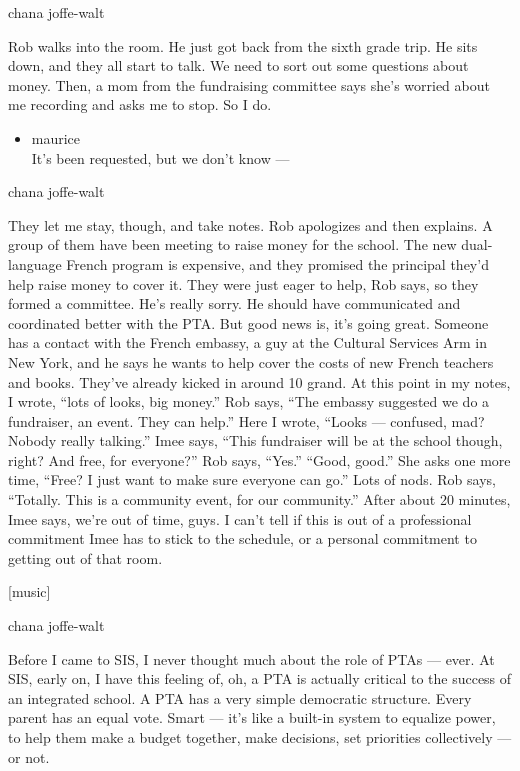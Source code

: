 chana joffe-walt

Rob walks into the room. He just got back from the sixth grade trip. He
sits down, and they all start to talk. We need to sort out some
questions about money. Then, a mom from the fundraising committee says
she's worried about me recording and asks me to stop. So I do.

\begin{itemize}
\tightlist
\item
  maurice\\
  It's been requested, but we don't know ---
\end{itemize}

chana joffe-walt

They let me stay, though, and take notes. Rob apologizes and then
explains. A group of them have been meeting to raise money for the
school. The new dual-language French program is expensive, and they
promised the principal they'd help raise money to cover it. They were
just eager to help, Rob says, so they formed a committee. He's really
sorry. He should have communicated and coordinated better with the PTA.
But good news is, it's going great. Someone has a contact with the
French embassy, a guy at the Cultural Services Arm in New York, and he
says he wants to help cover the costs of new French teachers and books.
They've already kicked in around 10 grand. At this point in my notes, I
wrote, ``lots of looks, big money.'' Rob says, ``The embassy suggested
we do a fundraiser, an event. They can help.'' Here I wrote, ``Looks ---
confused, mad? Nobody really talking.'' Imee says, ``This fundraiser
will be at the school though, right? And free, for everyone?'' Rob says,
``Yes.'' ``Good, good.'' She asks one more time, ``Free? I just want to
make sure everyone can go.'' Lots of nods. Rob says, ``Totally. This is
a community event, for our community.'' After about 20 minutes, Imee
says, we're out of time, guys. I can't tell if this is out of a
professional commitment Imee has to stick to the schedule, or a personal
commitment to getting out of that room.

{[}music{]}

chana joffe-walt

Before I came to SIS, I never thought much about the role of PTAs ---
ever. At SIS, early on, I have this feeling of, oh, a PTA is actually
critical to the success of an integrated school. A PTA has a very simple
democratic structure. Every parent has an equal vote. Smart --- it's
like a built-in system to equalize power, to help them make a budget
together, make decisions, set priorities collectively --- or not.

